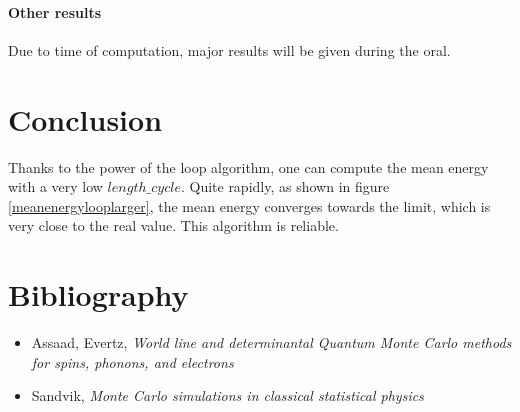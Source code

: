 \documentclass[a4paper,12pt,twoside]{article}
\begin{document}
	\paragraph{Other results}
	Due to time of computation, major results will be given during the oral.
	\newline
	
	\newpage
	\section{Conclusion}
	Thanks to the power of the loop algorithm, one can compute the mean energy with a very low $length\_cycle$. Quite rapidly, as shown in figure \ref{meanenergylooplarger}, the mean energy converges towards the limit, which is very close to the real value. This algorithm is reliable.
	
	\section{Bibliography}
	\begin{itemize}[label=$\star$]
		\item Assaad, Evertz, \emph{World line and determinantal Quantum Monte Carlo methods for spins, phonons, and electrons}
		\item Sandvik, \emph{Monte Carlo simulations in classical statistical physics}
	\end{itemize} 
	
	
\end{document}
